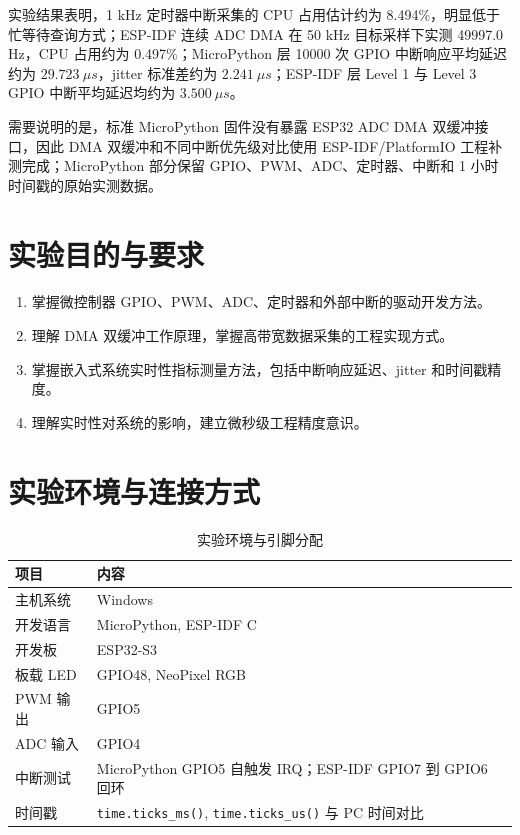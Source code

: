 \documentclass[UTF8,fontset=windows,a4paper,12pt]{ctexart}
\begin{document}
实验结果表明，1 kHz 定时器中断采集的 CPU 占用估计约为 8.494\%，明显低于忙等待查询方式；ESP-IDF 连续 ADC DMA 在 50 kHz 目标采样下实测 49997.0 Hz，CPU 占用约为 0.497\%；MicroPython 层 10000 次 GPIO 中断响应平均延迟约为 $29.723~\mu s$，jitter 标准差约为 $2.241~\mu s$；ESP-IDF 层 Level 1 与 Level 3 GPIO 中断平均延迟均约为 $3.500~\mu s$。

需要说明的是，标准 MicroPython 固件没有暴露 ESP32 ADC DMA 双缓冲接口，因此 DMA 双缓冲和不同中断优先级对比使用 ESP-IDF/PlatformIO 工程补测完成；MicroPython 部分保留 GPIO、PWM、ADC、定时器、中断和 1 小时时间戳的原始实测数据。

\section{实验目的与要求}

\begin{enumerate}[label=\arabic*.]
  \item 掌握微控制器 GPIO、PWM、ADC、定时器和外部中断的驱动开发方法。
  \item 理解 DMA 双缓冲工作原理，掌握高带宽数据采集的工程实现方式。
  \item 掌握嵌入式系统实时性指标测量方法，包括中断响应延迟、jitter 和时间戳精度。
  \item 理解实时性对系统的影响，建立微秒级工程精度意识。
\end{enumerate}

\section{实验环境与连接方式}

\begin{table}[H]
\centering
\caption{实验环境与引脚分配}
\begin{tabularx}{\textwidth}{lY}
\toprule
项目 & 内容 \\
\midrule
主机系统 & Windows \\
开发语言 & MicroPython, ESP-IDF C \\
开发板 & ESP32-S3 \\
板载 LED & GPIO48, NeoPixel RGB \\
PWM 输出 & GPIO5 \\
ADC 输入 & GPIO4 \\
中断测试 & MicroPython GPIO5 自触发 IRQ；ESP-IDF GPIO7 到 GPIO6 回环 \\
时间戳 & \texttt{time.ticks\_ms()}, \texttt{time.ticks\_us()} 与 PC 时间对比 \\
\bottomrule
\end{tabularx}
\end{table}
\end{document}
